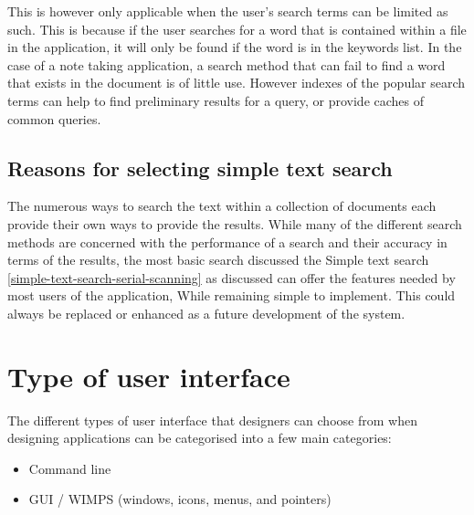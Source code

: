 This is however only applicable when the user's search terms can be limited as
such. This is because if the user searches for a word that is contained within a
file in the application, it will only be found if the word is in the keywords
list. In the case of a note taking application, a search method that can fail to
find a word that exists in the  document is of little use. However indexes of
the popular search terms can help to find preliminary results for a query, or
provide caches of common queries.




\subsection{Reasons for selecting simple text
search}\label{reasons-for-selecting-simple-text-search}

The numerous ways to search the text within a collection of documents each
provide their own ways to provide the results. While many of the different
search methods are concerned with the performance of a search and their accuracy
in terms of the results, the most basic search discussed the Simple text search
\ref{simple-text-search-serial-scanning} as discussed can offer the features
needed by most users of the application, While remaining simple to implement.
This could always be replaced or enhanced as a future development of the
system.

\section{Type of user interface}\label{type-of-user-interface}

The different types of user interface that designers can choose from
when designing applications can be categorised into a few main
categories:

\begin{itemize}
  \item Command line
  \item GUI / WIMPS (windows, icons, menus, and pointers)
\end{itemize}

